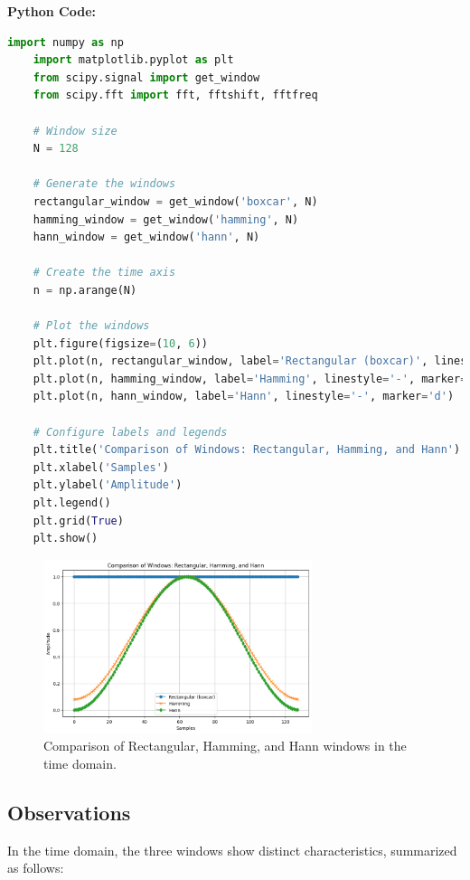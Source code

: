 \documentclass[10pt]{article}
\theoremstyle{definition}
\theoremstyle{remark}
\theoremstyle{definition}
\numberwithin{equation}{prob}
\begin{document}
\textbf{Python Code:}
\begin{lstlisting}[language=Python]
	import numpy as np
	import matplotlib.pyplot as plt
	from scipy.signal import get_window
	from scipy.fft import fft, fftshift, fftfreq
		
	# Window size
	N = 128
		
	# Generate the windows
	rectangular_window = get_window('boxcar', N)
	hamming_window = get_window('hamming', N)
	hann_window = get_window('hann', N)
		
	# Create the time axis
	n = np.arange(N)
		
	# Plot the windows
	plt.figure(figsize=(10, 6))
	plt.plot(n, rectangular_window, label='Rectangular (boxcar)', linestyle='-', marker='o')
	plt.plot(n, hamming_window, label='Hamming', linestyle='-', marker='x')
	plt.plot(n, hann_window, label='Hann', linestyle='-', marker='d')
		
	# Configure labels and legends
	plt.title('Comparison of Windows: Rectangular, Hamming, and Hann')
	plt.xlabel('Samples')
	plt.ylabel('Amplitude')
	plt.legend()
	plt.grid(True)
	plt.show()
\end{lstlisting}

\begin{figure}[H]
	\centering
	\includegraphics[width=0.7\textwidth]{./figures/Comparison of Windows.png}
	\caption{Comparison of Rectangular, Hamming, and Hann windows in the time domain.}
	\label{fig:time_domain}
\end{figure}

\newpage
	
\subsection*{Observations}
In the time domain, the three windows show distinct characteristics, summarized as follows:
\end{document}
